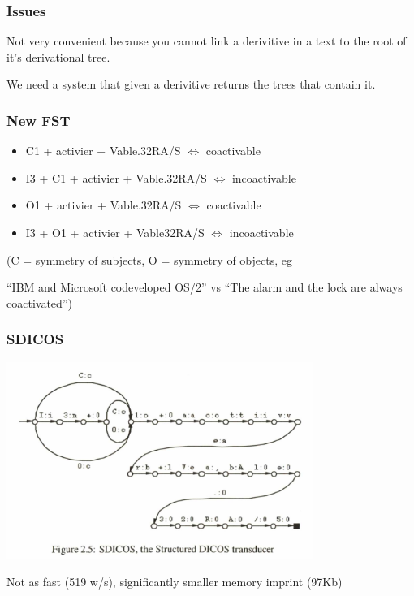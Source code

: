 \documentclass[10pt]{beamer}
\begin{document}
\begin{frame}[fragile]
  \frametitle{Issues}

  Not very convenient because you cannot link a derivitive in a text to the root of it's derivational tree. 

  We need a system that given a derivitive returns the trees that contain it. 
\end{frame}

\begin{frame}[fragile]
  \frametitle{New FST}

  \begin{itemize}
    \item C1 + activier + Vable.32RA/S $\iff$ coactivable
    \item I3 + C1 + activier + Vable.32RA/S $\iff$ incoactivable
    \item O1 + activier + Vable.32RA/S $\iff$ coactivable
    \item I3 + O1 + activier + Vable32RA/S $\iff$ incoactivable
  

  \end{itemize}
  \pause

  (C = symmetry of subjects, O = symmetry of objects, eg 

  ``IBM and Microsoft codeveloped OS/2'' vs ``The alarm and the lock are always coactivated'')
  
\end{frame}

\begin{frame}[fragile]
  \frametitle{SDICOS}

  \centerline{\includegraphics[width=10cm]{fig25.png}}

  \pause

  Not as fast (519 w/s), significantly smaller memory imprint (97Kb)
\end{frame}
\end{document}
